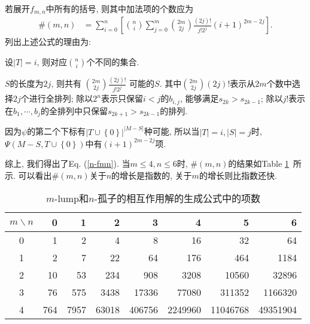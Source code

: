 \documentclass[12pt,a4paper,UTF8]{article}
\newcommand{\mbrace}[1]{\left[#1\right]}
\newcommand{\bbrace}[1]{\left\{#1\right\}}
\newcommand{\refeqn}[1]{Eq. (\ref{#1})}
\newcommand{\reftab}[1]{Table \ref{#1}~}
\newcommand{\MLNS}{$m$-lump和$n$-孤子的相互作用解}
\begin{document}
若展开$f_{m,n}$中所有的括号, 则其中加法项的个数应为
\begin{equation}
\begin{aligned}
\#(m,n)&=\sum_{i=0}^n\mbrace{\binom{n}{i}\sum_{j=0}^m{\binom{2m}{2j}\frac{(2j)!}{j!2^j}(i+1)^{2m-2j}}}. 
\end{aligned}
\label{n-fmn}
\end{equation}
列出上述公式的理由为:
\begin{compactitem}[\textbullet]
\item 设$|T|=i$, 则对应$\binom{n}{i}$个不同的集合.
\item $S$的长度为$2j$, 则共有 $\binom{2m}{2j}\frac{(2j)!}{j!2^j}$ 可能的$S$. 其中$\binom{2m}{2j}(2j)!$表示从$2m$个数中选择$2j$个进行全排列; 除以$2^n$表示只保留$i<j$的$b_{i,j}$, 能够满足$s_{2k}>s_{2k-1}$; 除以$j!$表示在$b_1,\cdots,b_j$的全排列中只保留$s_{2k+1}>s_{2k-1}$的排列. 
\item 因为$\psi$的第二个下标有$|T\cup \bbrace{0}|^{|M-S|}$种可能, 所以当$|T|=i,|S|=j$时, $\Psi(M-S,T\cup\bbrace{0})$中有$(i+1)^{2m-2j}$项.
\end{compactitem}
综上, 我们得出了\refeqn{n-fmn}. 当$m\le 4, n\le 6$时, $\#(m,n)$的结果如\reftab{tb-n-fmn}所示. 可以看出$\#(m,n)$关于$n$的增长是指数的, 关于$m$的增长则比指数还快. 

\begin{table}[htbp]
\centering 
\caption{\MLNS{}的生成公式中的项数} \label{tb-n-fmn}
\begin{tabular}{crrrrrrr}
\hline 
$m\backslash n$ & 0 & 1 & 2 & 3 & 4 & 5 & 6\\
\hline 
0 & 1 & 2 & 4 & 8 & 16 & 32 & 64 \\
1 & 2 & 7 & 22 & 64 & 176 & 464 & 1184 \\
2 & 10 & 53 & 234 & 908 & 3208 & 10560 & 32896 \\
3 & 76 & 575 & 3438 & 17336 & 77080 & 311352 & 1166320 \\
4 & 764 & 7957 & 63018 & 406756 & 2249960 & 11046768 & 49351904 \\
\hline 
\end{tabular}
\end{table}
\end{document}
